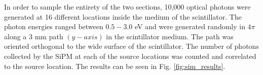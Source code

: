 
In order to sample the entirety of the two sections, 10,000 optical photons were generated at 16 different locations inside the medium of the scintillator. 
The photon energies ranged between $0.5 - 3.0$ eV \cite{krane_ch7} and were generated randomly in $4\pi$ along a 3 mm path $(y-axis)$ in the scintillator medium.  The path was oriented orthogonal to the wide surface of the scintillator.  
The number of photons collected by the SiPM at each of the source locations was counted and correlated to the source location.  The results can be seen in Fig. \ref{fig:sim_results}.
